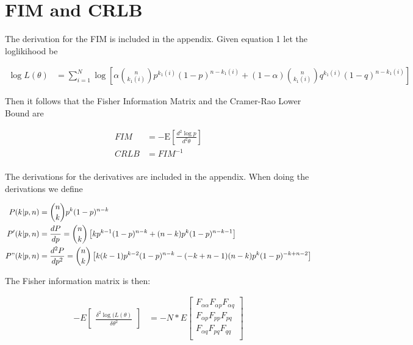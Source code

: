 \section{FIM and CRLB}

The derivation for the FIM is included in the appendix. Given equation 1 let the loglikihood be

\begin{align*}
\log L(\mathbb{\theta}) &= \sum_{i=1}^{N} \log \left[ \alpha \binom{n}{k_1(i)} p^{k_1(i)} (1-p)^{n - k_1(i)} + (1-\alpha) \binom{n}{k_1(i)} q^{k_1(i)} (1-q)^{n - k_1(i)}  \right] 
\end{align*}

Then it follows that the Fisher Information Matrix and the Cramer-Rao Lower Bound are

\begin{align*}
FIM &= -\mathrm{E} \left[\frac{d^2 \log p}{d^2\mathbb{\theta}}\right] \\
CRLB &= FIM^{-1} \\
\end{align*}

The derivations for the derivatives are included in the appendix. When doing the derivations we define

\begin{align*}
P(k | p, n) &= \binom{n}{k}p^{k}(1 - p)^{n - k} \\
P'(k | p, n) &= \frac{dP}{dp} = \binom{n}{k}\left[kp^{k - 1}(1 - p)^{n - k} + (n - k)p^{k}(1 - p)^{n - k - 1}\right]\\
P"(k | p, n) &= \frac{d^2P}{dp^2} = \binom{n}{k}\left[k(k - 1)p^{k - 2}(1 - p)^{n - k} - (-k + n - 1)(n - k)p^k(1 - p)^{-k + n - 2} \right]\\
\end{align*}

The Fisher information matrix is then:

\begin{align*}
-E\begin{bmatrix}\frac{\delta^2\log(L(\mathbb{\theta})}{{\delta\theta}^2}\end{bmatrix} &= -N * E\begin{bmatrix}
F_{\alpha\alpha} F_{\alpha p} F_{\alpha q} \\
F_{\alpha p} F_{pp} F_{pq} \\
F_{\alpha q} F_{pq} F_{qq} \\
\end{bmatrix}
\end{align*}

